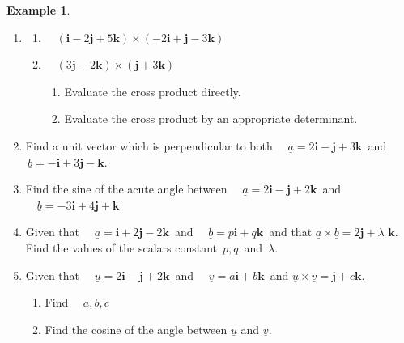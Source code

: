 \documentclass[11pt,a4paper]{article}
\theoremstyle{definition}
\newtheorem{example}[thm]{Example}
\begin{document}
\begin{example}

\begin{enumerate}
\item 
\begin{enumerate}
      \item $\quad  \left(\textbf{i} - 2\textbf{j} + 5\textbf{k}\right)\times \left(-2\textbf{i} + \textbf{j} - 3\textbf{k}\right)$
      
      \item $\quad  \left(3\textbf{j} - 2\textbf{k}\right) \times \left(\textbf{j} + 3\textbf{k}\right)$
\begin{enumerate}
            \item Evaluate the cross product directly.
            \item Evaluate the cross product by an appropriate determinant.
\end{enumerate}
\end{enumerate}


\item Find a unit vector which is perpendicular to both $\quad  \underline{a} = 2\textbf{i} - \textbf{j} + 3\textbf{k}\,$ and\\ $\, \underline{b} = -\textbf{i} + 3\textbf{j} - \textbf{k}$.

\item Find the sine of the acute angle between $\quad  \underline{a} = 2\textbf{i} - \textbf{j} + 2\textbf{k}\,$ and $\quad  \underline{b} = -3\textbf{i} +  4\textbf{j} + \textbf{k}\,$

\item Given that  $\quad  \underline{a} = \textbf{i} + 2 \textbf{j} - 2\textbf{k}\,$ and $\quad  \underline{b} = p\textbf{i}  + q\textbf{k}\,$ and that $\underline{a}\times \underline{b} = 2\textbf{j} + \lambda \textbf{ k}$. Find the values of the scalars constant $\, p, q\,$ and $\, \lambda$.

\item Given that $\quad  \underline{u} = 2\textbf{i} - \textbf{j} + 2\textbf{k}\,$ and $\quad  \underline{v} = a\textbf{i}  + b\textbf{k}\,$ and $\underline{u}\times \underline{v} = \textbf{j} + c\textbf{k}$.
\begin{enumerate}
      \item Find $\quad  a, b, c$
      
      \item Find the cosine of the angle between $\underline{u}$ and $\underline{v}$.\\\\
\end{enumerate}
\end{enumerate}
\end{example}
\end{document}
